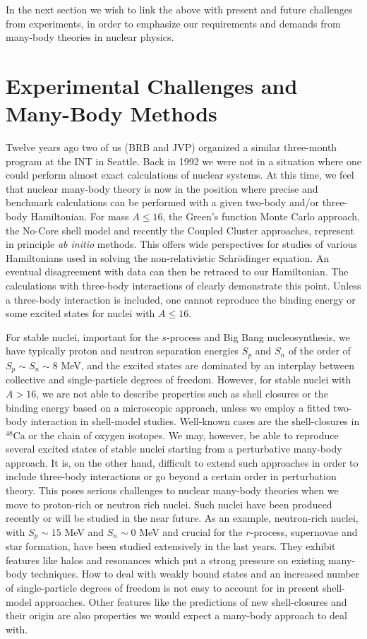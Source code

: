 \documentclass[12pt]{iopart}
\begin{document}
In the next section we wish to link the above 
with present and future challenges
from experiments, in order to emphasize our 
requirements and demands from 
many-body theories in nuclear physics.

\section{Experimental Challenges and Many-Body Methods} 

Twelve years ago two of us (BRB and JVP) organized 
a similar three-month program
at the INT in Seattle. Back in 1992 we were 
not in a situation where one could perform
almost exact calculations of nuclear systems.
At this time, we feel that nuclear many-body theory is now in the position
where precise and benchmark calculations can be performed with a given
two-body and/or three-body Hamiltonian. 
For mass $A\le 16$, the Green's function Monte Carlo
approach, the No-Core shell model and recently the Coupled 
Cluster approaches,
represent in principle {\it ab initio} methods. 
This offers wide perspectives for studies
of various Hamiltonians used in  solving the 
non-relativistic Schr\"odinger
equation. An eventual disagreement with data can 
then be retraced to our Hamiltonian.
The calculations with three-body interactions of 
clearly demonstrate this point. Unless a three-body 
interaction is included, one cannot  reproduce the binding 
energy or some excited states for nuclei with $A\le 16$. 

For stable nuclei, important for the $s$-process and Big Bang nucleosynthesis,
we have typically proton and neutron separation energies 
$S_p$ and $S_n$ of the  order of $S_p\sim S_n \sim 8$ MeV,
and the excited states are dominated by an interplay 
between collective and single-particle  degrees of freedom. 
However, for stable nuclei with $A > 16$, we are 
not able to describe properties such as shell 
closures or the binding energy based on a microscopic approach,
unless we employ a fitted two-body interaction in shell-model studies. 
Well-known cases are the shell-closures in $^{48}$Ca or 
the chain of oxygen isotopes.
We may, however, be able to reproduce several excited 
states of stable nuclei starting from a perturbative 
many-body approach.  It is, on the other hand, difficult 
to extend such approaches in 
order to include three-body interactions or go 
beyond a certain order in perturbation theory. 
This poses serious challenges to nuclear many-body 
theories when we move to proton-rich
or neutron rich nuclei. Such nuclei have been produced recently 
or will be studied in the near future. As an example, neutron-rich nuclei, with 
$S_p\sim 15$ MeV and $S_n\sim 0$ MeV and crucial 
for the $r$-process, supernovae and 
star formation, have been studied extensively in 
the last years. They exhibit features 
like halos and resonances which put a strong pressure on existing   
many-body techniques. How to deal with weakly bound states and 
an increased number of single-particle degrees of 
freedom is not easy to account for in present shell-model 
approaches. Other features like the predictions of 
new shell-closures and their origin
are also properties we would expect a many-body approach to deal with. 
\end{document}
